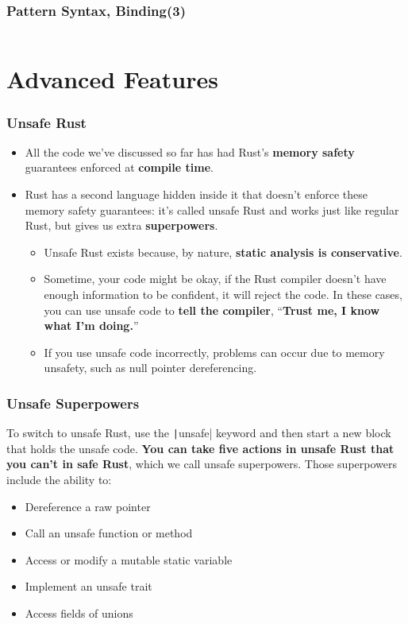 \documentclass{beamer}
\begin{document}
\begin{frame}[fragile]
	\frametitle{Pattern Syntax, Binding(3)}
	\inputminted{rust}{./code/pattern20.rs}
\end{frame}


\section{Advanced Features}

\begin{frame}[fragile]
	\frametitle{Unsafe Rust}
	\begin{itemize}
		\item All the code we’ve discussed so far has had Rust’s \textbf{memory safety} guarantees enforced at \textbf{compile time}.
		\item 	Rust has a second language hidden inside it that doesn’t enforce these memory safety guarantees: it’s called unsafe Rust and works just like regular Rust, but gives us extra \textbf{superpowers}.
		\begin{itemize}
			\item Unsafe Rust exists because, by nature, \textbf{static analysis is conservative}. 
			\item 	Sometime, your code might be okay, if the Rust compiler doesn’t have enough information to be confident, it will reject the code. In these cases, you can use unsafe code to \textbf{tell the compiler}, “\textbf{Trust me, I know what I’m doing.}” 
			\item 	If you use unsafe code incorrectly, problems can occur due to memory unsafety, such as null pointer dereferencing.
		\end{itemize}
	\end{itemize}
\end{frame}

\begin{frame}[fragile]
	\frametitle{Unsafe Superpowers}
	To switch to unsafe Rust, use the \texttt|unsafe| keyword and then start a new block that holds the unsafe code.\textbf{ You can take five actions in unsafe Rust that you can’t in safe Rust}, which we call unsafe superpowers. Those superpowers include the ability to:
	
	\begin{itemize}
		\item Dereference a raw pointer
		\item 	Call an unsafe function or method
		\item 	Access or modify a mutable static variable
		\item 	Implement an unsafe trait
		\item 	Access fields of unions
	\end{itemize}
\end{frame}
\end{document}
